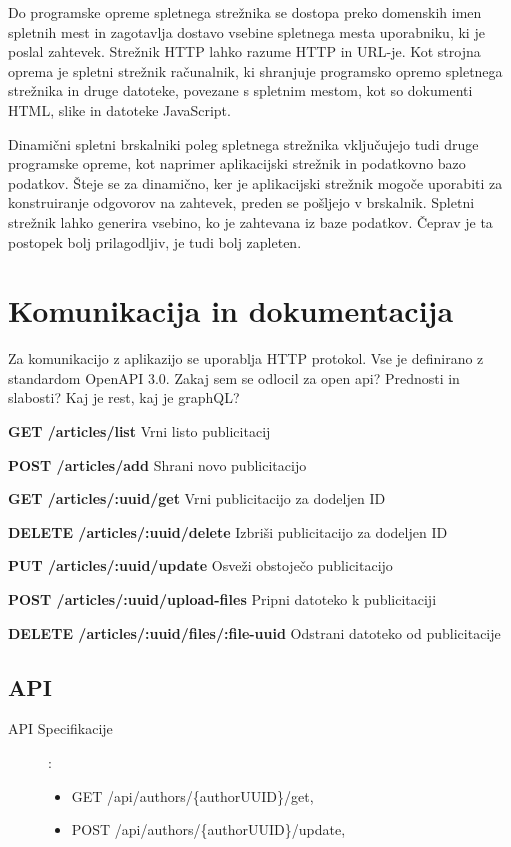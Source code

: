 \documentclass[a4paper, 12pt]{book}
\begin{document}
Do programske opreme spletnega strežnika se dostopa preko domenskih imen spletnih mest in zagotavlja dostavo vsebine spletnega mesta uporabniku, ki je poslal zahtevek. Strežnik HTTP lahko razume HTTP in URL-je. Kot strojna oprema je spletni strežnik računalnik, ki shranjuje programsko opremo spletnega strežnika in druge datoteke, povezane s spletnim mestom, kot so dokumenti HTML, slike in datoteke JavaScript.

Dinamični spletni brskalniki poleg spletnega strežnika vključujejo tudi druge programske opreme, kot naprimer aplikacijski strežnik in podatkovno bazo podatkov. Šteje se za dinamično, ker je aplikacijski strežnik mogoče uporabiti za konstruiranje odgovorov na zahtevek, preden se pošljejo v brskalnik. Spletni strežnik lahko generira vsebino, ko je zahtevana iz baze podatkov. Čeprav je ta postopek bolj prilagodljiv, je tudi bolj zapleten.

\section{Komunikacija in dokumentacija}
Za komunikacijo z aplikazijo se uporablja HTTP protokol. Vse je definirano z standardom OpenAPI 3.0. 
Zakaj sem se odlocil za open api? Prednosti in slabosti? Kaj je rest, kaj je graphQL? 

\begin{description}
    \item \textbf{GET /articles/list} Vrni listo publicitacij
    \item \textbf{POST /articles/add} Shrani novo publicitacijo
    \item \textbf{GET /articles/:uuid/get} Vrni publicitacijo za dodeljen ID 
    \item \textbf{DELETE /articles/:uuid/delete} Izbriši publicitacijo za dodeljen ID
    \item \textbf{PUT /articles/:uuid/update} Osveži obstoječo publicitacijo
    \item \textbf{POST /articles/:uuid/upload-files} Pripni datoteko k publicitaciji
    \item \textbf{DELETE /articles/:uuid/files/:file-uuid} Odstrani datoteko od publicitacije
\end{description}
\subsection{API}

\begin{description}
\item[API Specifikacije]:
	\begin{itemize}
		\item GET /api/authors/\{authorUUID\}/get,
		\item POST /api/authors/\{authorUUID\}/update,
	\end{itemize}
\end{description}
\end{document}
